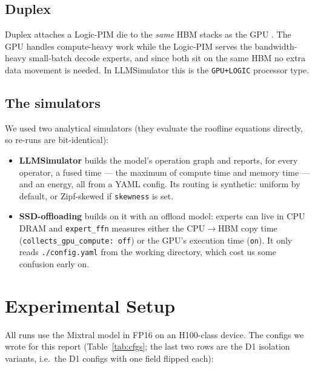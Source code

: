 \documentclass[11pt,a4paper]{report}
\begin{document}
\section{Duplex}

Duplex attaches a Logic-PIM die to the \textit{same} HBM stacks as the GPU \cite{duplex}. The GPU handles compute-heavy work while the Logic-PIM serves the bandwidth-heavy small-batch decode experts, and since both sit on the same HBM no extra data movement is needed. In LLMSimulator this is the \texttt{GPU+LOGIC} processor type.

\section{The simulators}

We used two analytical simulators (they evaluate the roofline equations directly, so re-runs are bit-identical):
\begin{itemize}
\item \textbf{LLMSimulator} \cite{llmsim} builds the model's operation graph and reports, for every operator, a fused time --- the maximum of compute time and memory time --- and an energy, all from a YAML config. Its routing is synthetic: uniform by default, or Zipf-skewed if \texttt{skewness} is set.
\item \textbf{SSD-offloading} \cite{ssd} builds on it with an offload model: experts can live in CPU DRAM and \texttt{expert\_ffn} measures either the CPU$\rightarrow$HBM copy time (\texttt{collects\_gpu\_compute: off}) or the GPU's execution time (\texttt{on}). It only reads \texttt{./config.yaml} from the working directory, which cost us some confusion early on.
\end{itemize}

\chapter{Experimental Setup}
\label{ch:setup}

All runs use the Mixtral model in FP16 on an H100-class device. The configs we wrote for this report (Table~\ref{tab:cfgs}; the last two rows are the D1 isolation variants, i.e.\ the D1 configs with one field flipped each):
\end{document}
